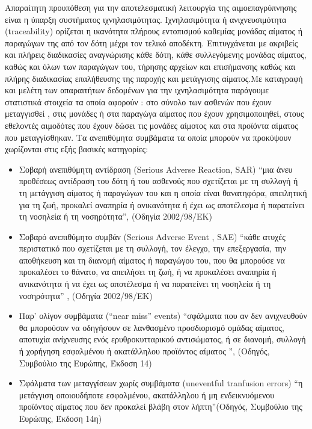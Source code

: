 		
	Απαραίτητη προυπόθεση για την αποτελεσματική λειτουργία της αιμοεπαγρύπνησης είναι η 	ύπαρξη συστήματος ιχνηλασιμότητας. Ιχνηλασιμότητα ή ανιχνευσιμότητα (traceability) ορίζεται η ικανότητα πλήρους εντοπισμού καθεμίας μονάδας αίματος ή παραγώγων της από τον δότη μέχρι τον τελικό αποδέκτη. Επιτυγχάνεται  με ακριβείς και πλήρεις διαδικασίες αναγνώρισης κάθε δότη, κάθε συλλεγόμενης μονάδας αίματος, καθώς και όλων των παραγώγων του, τήρησης αρχείων και επισήμανσης καθώς και πλήρης διαδικασίας επαλήθευσης της παροχής και μετάγγισης αίματος.Με καταγραφή και μελέτη των απαραιτήτων  δεδομένων για την ιχνηλασιμότητα παράγουμε στατιστικά στοιχεία τα οποία αφορούν : στο  σύνολο των ασθενών που έχουν μεταγγισθεί , στις μονάδες ή στα παραγώγα αίματος που έχουν χρησιμοποιηθεί, στους εθελοντές αιμοδότες που έχουν δώσει τις μονάδες αίμοτος και στα προϊόντα αίματος που μεταγγίσθηκαν. 
		Τα ανεπιθύμητα συμβάματα τα οποία μπορούν να προκύψουν χωρίζονται στις εξής βασικές κατηγορίες:
		\begin{itemize}
		\item	 Σοβαρή ανεπιθύμητη αντίδραση (Serious Adverse Reaction, SAR)
		 “μια άνευ προθέσεως αντίδραση του δότη ή του ασθενούς που σχετίζεται με τη συλλογή ή τη μετάγγιση αίματος ή παραγώγων του 			και η οποία είναι θανατηφόρα, απειλητική για τη ζωή, προκαλεί αναπηρία ή ανικανότητα ή έχει ως αποτέλεσμα ή παρατείνει τη νοσηλεία ή τη νοσηρότητα”, (Οδηγία 2002/98/ΕΚ)
 		\item Σοβαρό ανεπιθύμητο συμβάν (Serious Adverse Event , SAE)
 		“κάθε ατυχές περιστατικό που σχετίζεται με τη συλλογή, τον έλεγχο, την επεξεργασία, την αποθήκευση και τη διανομή αίματος ή 				παραγώγου του, που θα μπορούσε να προκαλέσει το θάνατο, να απειλήσει τη ζωή, ή να προκαλέσει αναπηρία ή ανικανότητα ή να έχει ως αποτέλεσμα ή να παρατείνει τη νοσηλεία ή τη νοσηρότητα” , (Οδηγία 2002/98/ΕΚ)
 		\item Παρ’ ολίγον συμβάματα (“near miss” events)
 		 “σφάλματα που αν δεν ανιχνευθούν θα μπορούσαν να οδηγήσουν σε λανθασμένο προσδιορισμό ομάδας αίματος, αποτυχία
 		 ανίχνευσης ενός ερυθροκυτταρικού αντισώματος, ή σε διανομή, συλλογή ή χορήγηση εσφαλμένου ή ακατάλληλου προϊόντος
 		 αίματος ”, (Οδηγός, Συμβούλιο της Ευρώπης, Έκδοση 14) 
 		 \item Σφάλματα των μεταγγίσεων χωρίς συμβάματα (uneventful tranfusion errors)
 		 “η μετάγγιση οποιουδήποτε εσφαλμένου, ακατάλληλου ή μη ενδεικνυόμενου προϊόντος αίματος που δεν προκαλεί βλάβη στον 					λήπτη”(Οδηγός, Συμβούλιο της Ευρώπης, Έκδοση 14η)
 		 \end{itemize} 
